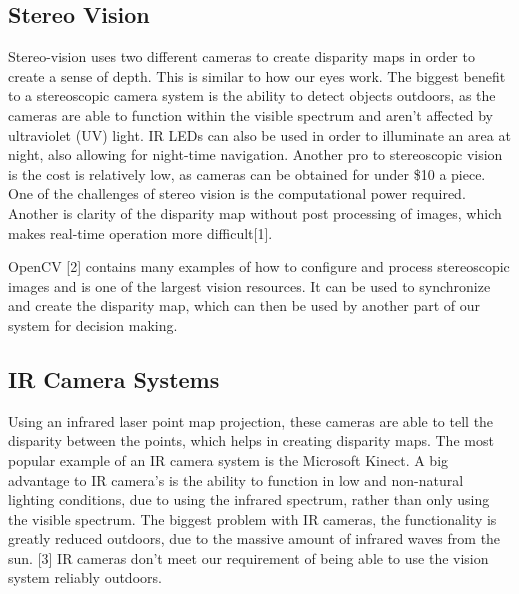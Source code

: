 \documentclass[compsoc,draftclsnofoot,onecolumn,10pt]{IEEEtran}
\begin{document}
\subsection{Stereo Vision}
Stereo-vision uses two different cameras to create disparity maps in order to create a sense of depth. 
This is similar to how our eyes work. 
The biggest benefit to a stereoscopic camera system is the ability to detect objects outdoors, as the cameras are able to function within the visible spectrum and aren't affected by ultraviolet (UV) light. 
IR LEDs can also be used in order to illuminate an area at night, also allowing for night-time navigation. 
Another pro to stereoscopic vision is the cost is relatively low, as cameras can be obtained for under \$10 a piece.  
One of the challenges of stereo vision is the computational power required. 
Another is clarity of the disparity map without post processing of images, which makes real-time operation more difficult[1]. \par
OpenCV [2] contains many examples of how to configure and process stereoscopic images and is one of the largest vision resources. It can be used to synchronize and create the disparity map, which can then be used by another part of our system for decision making. 

\subsection{IR Camera Systems}
Using an infrared laser point map projection, these cameras are able to tell the disparity between the points, which helps in creating disparity maps. The most popular example of an IR camera system is the Microsoft Kinect. 
A big advantage to IR camera's is the ability to function in low and non-natural lighting conditions, due to using the infrared spectrum, rather than only using the visible spectrum. 
The biggest problem with IR cameras, the functionality is greatly reduced outdoors, due to the massive amount of infrared waves from the sun. [3]
IR cameras don't meet our requirement of being able to use the vision system reliably outdoors.
\end{document}
